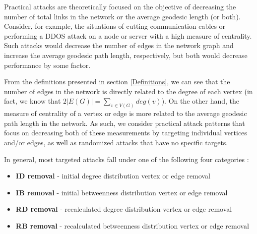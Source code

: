 \documentclass[doc]{apa}%
\begin{document}
Practical attacks are theoretically focused on the objective of decreasing the number of total links in the network or the average geodesic length (or both). Consider, for example, the situations of cutting communication cables or performing a DDOS attack on a node or server with a high measure of centrality. Such attacks would decrease the number of edges in the network graph and increase the average geodesic path length, respectively, but both would decrease performance by some factor.

From the definitions presented in section \ref{Definitions}, we can see that the number of edges in the network is directly related to the degree of each vertex (in fact, we know that $2|E(G)| =\sum_{v \in V(G)}deg(v)$). On the other hand, the measure of centrality of a vertex or edge is more related to the average geodesic path length in the network. As such, we consider practical attack patterns that focus on decreasing both of these measurements by targeting individual vertices and/or edges, as well as randomized attacks that have no specific targets. 

In general, most targeted attacks fall under one of the following four categories \cite{Attacks}:
\begin{itemize}
	\item \textbf{ID removal} - initial degree distribution vertex or edge removal
	\item \textbf{IB removal} - initial betweenness distribution vertex or edge removal
	\item \textbf{RD removal} - recalculated degree distribution vertex or edge removal
	\item \textbf{RB removal} - recalculated betweenness distribution vertex or edge removal
\end{itemize}

\end{document}
